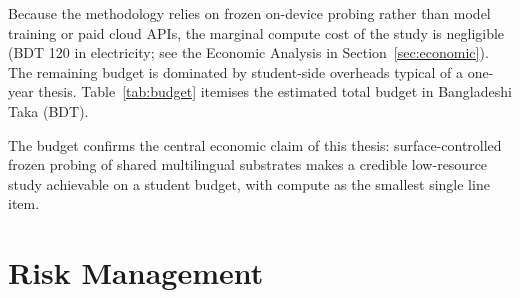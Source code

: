 Because the methodology relies on frozen on-device probing rather than model training or paid cloud APIs, the marginal compute cost of the study is negligible (BDT 120 in electricity; see the Economic Analysis in Section~\ref{sec:economic}). The remaining budget is dominated by student-side overheads typical of a one-year thesis. Table~\ref{tab:budget} itemises the estimated total budget in Bangladeshi Taka (BDT).

\begin{table}[H]
\centering
\caption{Estimated one-year thesis budget (BDT). Compute is the smallest line item; the budget is dominated by connectivity and thesis-production overheads.}
\label{tab:budget}
\small
{}
\end{table}

The budget confirms the central economic claim of this thesis: surface-controlled frozen probing of shared multilingual substrates makes a credible low-resource study achievable on a student budget, with compute as the smallest single line item.

\section{Risk Management}

